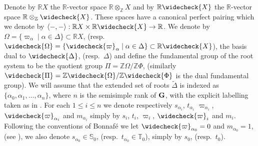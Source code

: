 \documentclass[eqthmnum]{jt-calcs}
\begin{document}
\begin{pa}
Denote by $\mathbb{R}X$ the $\mathbb{R}$-vector space $\mathbb{R} \otimes_{\mathbb{Z}} X$ and by $\mathbb{R}\widecheck{X}$ the $\mathbb{R}$-vector space $\mathbb{R} \otimes_{\mathbb{Z}} \widecheck{X}$. These spaces have a canonical perfect pairing which we denote by $\langle-,-\rangle : \mathbb{R}X \times \mathbb{R}\widecheck{X} \to \mathbb{R}$. We denote by $\Omega = \{\varpi_{\alpha} \mid \alpha \in \Delta\} \subset \mathbb{R}X$, (resp.\ $\widecheck{\Omega} = \{\widecheck{\varpi}_{\alpha} \mid \alpha \in \Delta\} \subset \mathbb{R}\widecheck{X}$), the basis dual to $\widecheck{\Delta}$, (resp.\ $\Delta$) and define the fundamental group of the root system to be the quotient group $\Pi = \mathbb{Z}\Omega/\mathbb{Z}\Phi$, (similarly $\widecheck{\Pi} = \mathbb{Z}\widecheck{\Omega}/\mathbb{Z}\widecheck{\Phi}$ is the dual fundamental group). We will assume that the extended set of roots $\tilde{\Delta}$ is indexed as $\{\alpha_0,\alpha_1,\dots,\alpha_n\}$, where $n$ is the semisimple rank of $\mathbf{G}$, with the explicit labelling taken as in \cite[Plate I - IX]{bourbaki:2002:lie-groups-chap-4-6}. For each $1 \leqslant i \leqslant n$ we denote respectively $s_{\alpha_i}$, $t_{\alpha_i}$ $\varpi_{\alpha_i}$, $\widecheck{\varpi}_{\alpha_i}$ and $m_{\alpha_i}$ simply by $s_i$, $t_i$, $\varpi_i$, $\widecheck{\varpi}_i$ and $m_i$. Following the conventions of Bonnaf\'{e} we let $\widecheck{\varpi}_{\alpha_0} = 0$ and $m_{\alpha_0} = 1$, (see \cite[\S 3.B]{bonnafe:2005:quasi-isolated}), we also denote $s_{\alpha_0} \in \mathbb{S}_0$, (resp.\ $t_{\alpha_0} \in \mathbb{T}_0$), simply by $s_0$, (resp.\ $t_0$).
\end{pa}
\end{document}

